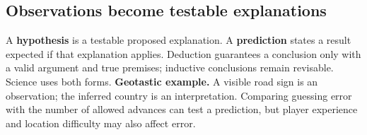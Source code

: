 \subsection*{Observations become testable explanations}
\begin{center}
\par
\end{center}
A \textbf{hypothesis} is a testable proposed explanation. A \textbf{prediction} states a result expected if that explanation applies. Deduction guarantees a conclusion only with a valid argument and true premises; inductive conclusions remain revisable. Science uses both forms.
\textbf{Geotastic example.} A visible road sign is an observation; the inferred country is an interpretation. Comparing guessing error with the number of allowed advances can test a prediction, but player experience and location difficulty may also affect error.

